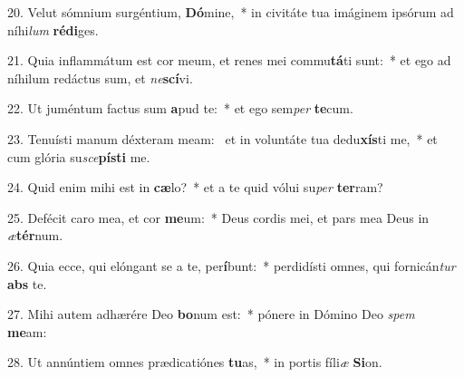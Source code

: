 20. Velut sómnium surgéntium, \textbf{Dó}mine,~*  in civitáte tua imáginem ipsórum ad níhi\textit{lum} \textbf{réd}\textbf{i}ges.\

21. Quia inflammátum est cor meum, et renes mei commu\textbf{tá}ti sunt:~*  et ego ad níhilum redáctus sum, et \textit{ne}\textbf{scí}vi.\

22. Ut juméntum factus sum \textbf{a}pud te:~*  et ego sem\textit{per} \textbf{te}cum.\

23. Tenuísti manum déxteram meam: \dag\  et in voluntáte tua dedu\textbf{xís}ti me,~*  et cum glória su\textit{sce}\textbf{pís}\textbf{ti} me.\

24. Quid enim mihi est in \textbf{cæ}lo?~*  et a te quid vólui su\textit{per} \textbf{ter}ram?\

25. Defécit caro mea, et cor \textbf{me}um:~*  Deus cordis mei, et pars mea Deus in \textit{æ}\textbf{tér}num.\

26. Quia ecce, qui elóngant se a te, per\textbf{í}bunt:~*  perdidísti omnes, qui fornicán\textit{tur} \textbf{abs} te.\

27. Mihi autem adhærére Deo \textbf{bo}num est:~*  pónere in Dómino Deo \textit{spem} \textbf{me}am:\

28. Ut annúntiem omnes prædicatiónes \textbf{tu}as,~*  in portis fíli\textit{æ} \textbf{Si}on.\

